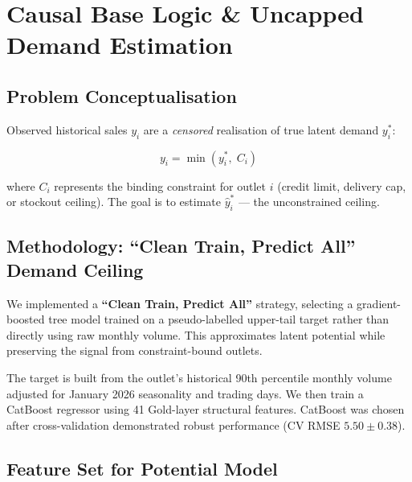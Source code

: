 \documentclass[11pt, a4paper]{article}
\begin{document}
\newpage


\section{Causal Base Logic \& Uncapped Demand Estimation}

\subsection{Problem Conceptualisation}

Observed historical sales $y_i$ are a \emph{censored} realisation of true
latent demand $y_i^*$:

\begin{equation}
  y_i = \min\!\left(y_i^*,\; C_i\right)
\end{equation}

where $C_i$ represents the binding constraint for outlet $i$ (credit limit,
delivery cap, or stockout ceiling). The goal is to estimate $\hat{y}_i^*$ — the
unconstrained ceiling.

\subsection{Methodology: ``Clean Train, Predict All'' Demand Ceiling}

We implemented a \textbf{``Clean Train, Predict All''} strategy, selecting a gradient-boosted tree model trained on a pseudo-labelled upper-tail
target rather than directly using raw monthly volume. This approximates latent
potential while preserving the signal from constraint-bound outlets.

\begin{infobox}
  The target is built from the outlet's historical 90th percentile monthly volume
  adjusted for January 2026 seasonality and trading days. We then train a
  CatBoost regressor using 41 Gold-layer structural features. CatBoost was chosen
  after cross-validation demonstrated robust performance (CV RMSE $5.50 \pm 0.38$).
\end{infobox}

\subsection{Feature Set for Potential Model}
\end{document}

